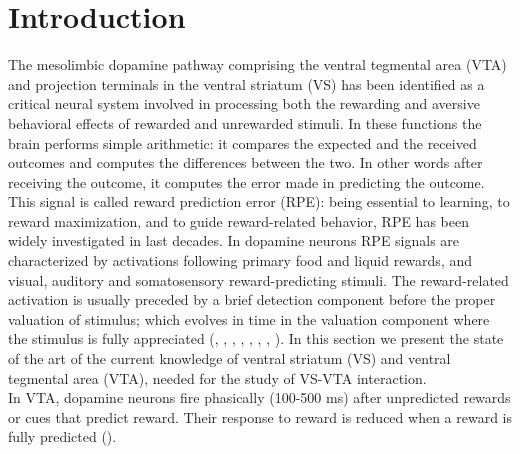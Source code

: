 \chapter{Introduction}
\label{chap:Introduction}
The mesolimbic dopamine pathway comprising the ventral tegmental area (VTA) and projection terminals in the ventral striatum (VS) has been identified as a critical neural system involved in processing both the rewarding and aversive behavioral effects of rewarded and unrewarded stimuli. In these functions the brain performs simple arithmetic: it compares the expected and the received outcomes and computes the differences between the two. In other words after receiving the outcome, it computes the error made in predicting the outcome. This signal is called reward prediction  error (RPE): being essential to learning, to reward maximization, and to guide reward-related behavior, RPE has been widely investigated in last decades. In dopamine neurons RPE signals are characterized by activations following primary food and liquid rewards, and visual, auditory and somatosensory reward-predicting stimuli. The reward-related activation is usually preceded by a brief detection component before the proper valuation of stimulus; which evolves in time in the valuation component where the stimulus is fully appreciated (\cite{Schultz2001}, \cite{Schultz2002}, \cite{Fiorillo}, \cite{Eshel1}, \cite{Pagnoni}, \cite{Radua}, \cite{Takahashi2016}, \cite{TianHuang}). In this section we present the state of the art of the current knowledge of ventral striatum (VS) and ventral tegmental area (VTA), needed for the study of VS-VTA interaction.\\In VTA, dopamine neurons fire phasically (100-500 ms) after unpredicted rewards or cues that predict reward. Their response to reward is reduced when a reward is fully predicted (\cite{Uchida}). %
